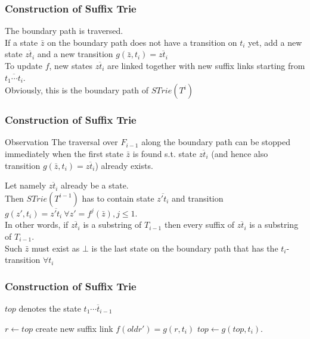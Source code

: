 \documentclass[compress,usenames,dvipsnames]{beamer}
\begin{document}
    \begin{frame} \frametitle{Construction of Suffix Trie}
        The boundary path is traversed. \\
        \hfill \break
        If a state $\bar{z}$ on the boundary path does not have a transition on $t_i$ yet,
        add a new state $\overline{zt_i}$ and a new transition $g(\bar{z}, t_i) = \overline{zt_i}$ \\
        \hfill \break
        To update $f$, new states $\overline{zt_i}$ are linked together with new suffix links starting from $\overline{t_1\cdots t_{i}}$. \\
        Obviously, this is the boundary path of $STrie(T^i)$
    \end{frame}

    \begin{frame} \frametitle{Construction of Suffix Trie}
        \begin{block}{Observation}
            The traversal over $F_{i-1}$ along the boundary path can be stopped immediately when the first state $\bar{z}$ is found s.t. state $\overline{zt_i}$ (and hence also transition $g(\bar{z}, t_i) = \overline{zt_i}$) already exists.
        \end{block}
        Let namely $\overline{zt_i}$ already be a state. \\
        \hfill \break
        Then $STrie(T^{i-1})$ has to contain state $\overline{z't_i}$ and transition $g(z', t_i) = \overline{z't_i} \ \forall z' = f^j(\bar{z}), j \leq 1$. \\
        In other words, if $\overline{zt_i}$ is a substring of $T_{i-1}$ then every suffix of $\overline{zt_i}$ is a substring of $T_{i-1}$.\\
        \hfill \break
        Such $\bar{z}$ must exist as $\bot$ is the last state on the boundary path that has the $t_i$-transition $\forall t_i$
    \end{frame}

    \begin{frame}\frametitle{Construction of Suffix Trie}
        $top$ denotes the state $\overline{t_1\cdots t_{i-1}}$
        \LinesNumbered
        \begin{algorithm}[H]
            \SetAlgoNoEnd
            $r \leftarrow top$\;
            create new suffix link $f(oldr') = g(r, t_i)$\;
            $top \leftarrow g(top, t_i)$.
            \caption{}
            \label{alg:1}
        \end{algorithm}
    \end{frame}
\end{document}
